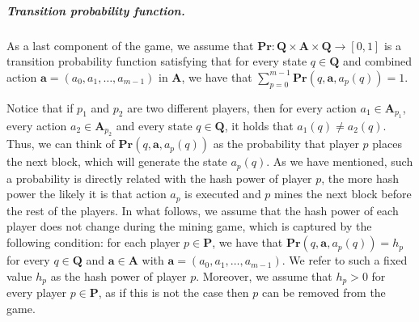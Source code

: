 \documentclass[a4paper,english,cleveref, autoref,numberwithinsect]{lipics-v2019}
\newcommand{\pr}{\mathbf{Pr}}
\newcommand{\ba}{\mathbf{a}}
\newcommand{\bP}{\mathbf{P}}
\newcommand{\bA}{\mathbf{A}}
\newcommand{\bR}{\mathbf{R}}
\newcommand{\bH}{\mathbf{H}}
\newcommand{\bQ}{\mathbf{Q}}
\begin{document}
\subparagraph*{Transition probability function.} %
As a last component of the game, we assume that $\pr : \bQ \times \bA \times \bQ \to [0,1]$ is a transition probability function satisfying that for every state $q \in \bQ$ and combined action $\ba = (a_0, a_1, \ldots, a_{m-1})$ in $\bA$, we have that $\sum_{p=0}^{m-1} \pr(q, \ba, a_p(q)) = 1$.

Notice that if $p_1$ and $p_2$ are two different players, then for every action $a_1 \in \bA_{p_1}$, every action $a_2 \in \bA_{p_2}$ and every state $q \in \bQ$, it holds that $a_1(q) \neq a_2(q)$. Thus, we can think of $\pr(q, \ba, a_p(q))$ as the probability that player $p$ places the next block, which will generate the state $a_p(q)$. As we have mentioned, such a probability is directly related with the hash power of player $p$, the more hash power the likely it is that action $a_p$ is executed and $p$ mines the next block before the rest of the players. In what follows, we assume that the hash power of each player does not change during the mining game, which is captured by the following condition:
for each player $p \in \bP$, we 
have that $\pr(q, \ba, a_p(q)) = h_p$ for every $q \in \bQ$ and $\ba \in \bA$ with $\ba = (a_0, a_1, \ldots, a_{m-1})$. We refer to such a fixed value $h_p$ 
as the hash power of player $p$.
Moreover, we assume that $h_p > 0$ for every player $p \in \bP$, as if this is not the case then $p$ can be removed from the game.
\end{document}
